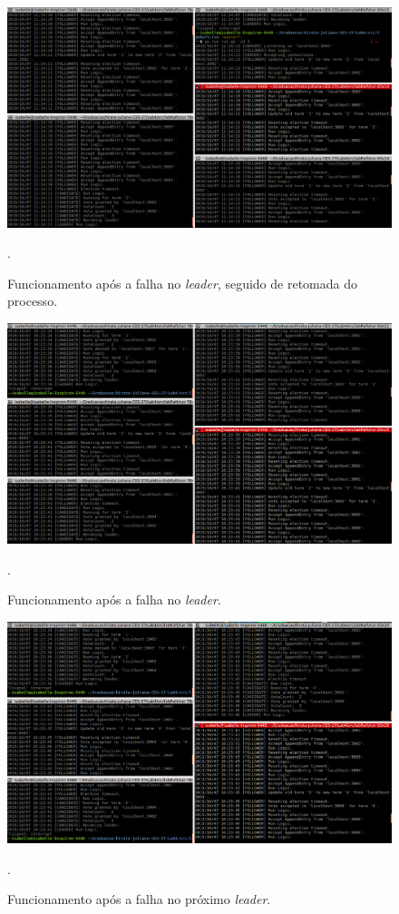 \documentclass[journal,onecolumn]{IEEEtran}
\begin{document}
\begin{figure}[H]
\centering
\centerline{\includegraphics[scale=0.4]{imagens/falha_no_lider.png}}
\caption{Funcionamento após a falha no \textit{leader}, seguido de retomada do processo.}.
\label{falha_no_lider}
\end{figure}

\begin{figure}[H]
\centering
\centerline{\includegraphics[scale=0.4]{imagens/1_falha.png}}
\caption{Funcionamento após a falha no \textit{leader}.}.
\label{1_falha}
\end{figure}

\begin{figure}[H]
\centering
\centerline{\includegraphics[scale=0.4]{imagens/2_falhas.png}}
\caption{Funcionamento após a falha no próximo \textit{leader}.}.
\label{2_falhas}
\end{figure}
\end{document}
